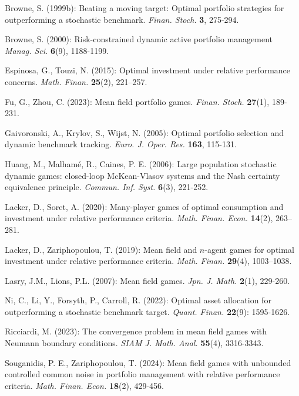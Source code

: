 \documentclass[11pt,times,letter]{article}
\numberwithin{equation}{section}
\begin{document}
\begin{thebibliography}{}
{ Browne, S. (1999b): Beating a moving target: Optimal portfolio strategies for outperforming a stochastic benchmark. {\it Finan. Stoch.} {\bf 3}, 275-294.

 Browne, S. (2000): Risk-constrained dynamic active portfolio management {\it Manag. Sci.} {\bf 6}(9), 1188-1199.

 Espinosa, G., Touzi, N. (2015): Optimal investment under relative performance concerns. {\it Math. Finan.}  {\bf 25}(2), 221–257.

 Fu, G., Zhou, C. (2023): Mean field portfolio games. {\it Finan. Stoch.} \textbf{27}(1), 189-231.

 Gaivoronski, A., Krylov, S., Wijst, N. (2005): Optimal portfolio selection and dynamic benchmark tracking. {\it Euro. J. Oper. Res.} {\bf 163}, 115-131.

 Huang, M., Malham{\'e}, R., Caines, P. E.  (2006): Large population stochastic dynamic games: closed-loop McKean-Vlasov systems and the Nash certainty equivalence principle. {\it Commun. Inf. Syst.} {\bf 6}(3), 221-252.

   Lacker, D.,  Soret, A. (2020): Many-player games of optimal consumption and investment under relative performance criteria.  {\it Math. Finan. Econ.} {\bf 14}(2), 263–281.

 Lacker, D.,  Zariphopoulou, T. (2019): Mean field and $n$-agent games for optimal investment under relative performance criteria. {\it Math. Finan.} \textbf{29}(4), 1003–1038.

 Lasry, J.M., Lions, P.L. (2007): Mean field games. {\it Jpn. J. Math.} {\bf 2}(1), 229-260.

 Ni, C., Li, Y., Forsyth, P., Carroll, R. (2022): Optimal asset allocation for outperforming a stochastic benchmark target. {\it Quant. Finan.} {\bf 22}(9): 1595-1626.

 Ricciardi, M. (2023): The convergence problem in mean field games with Neumann boundary conditions. {\it SIAM J.  Math. Anal.} {\bf 55}(4), 3316-3343.

 Souganidis, P. E.,  Zariphopoulou, T. (2024): Mean field games with unbounded controlled common noise in portfolio management with relative performance criteria. {\it Math. Finan. Econ.} \textbf{18}(2), 429-456.

}
\end{thebibliography}
\end{document}
